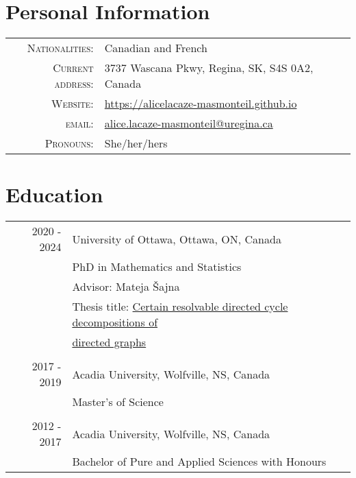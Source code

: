 \documentclass[letter,12pt]{article} %
\begin{document}


\par{\bigskip\par} %

\section{Personal Information}
\vspace{3mm}

\begin{tabular}{rl}
\textsc{Nationalities:} & Canadian and French  \\
\textsc{Current address:} & 3737 Wascana Pkwy, Regina, SK, S4S 0A2, Canada \\
\textsc{Website:} & \url{https://alicelacaze-masmonteil.github.io} \\
\textsc{email:} & \href{mailto:alice.lacaze-masmonteil@uregina.ca}{alice.lacaze-masmonteil@uregina.ca}\\
\textsc{Pronouns:}& She/her/hers\\
\end{tabular}

 
\section{Education}
\vspace{3mm}
\begin{tabular}{r | l}
 2020 - 2024 & University of Ottawa, Ottawa, ON, Canada \\
& PhD in Mathematics and Statistics \\
&Advisor: {Mateja \v{S}ajna} \\
&Thesis title: \href{https://ruor.uottawa.ca/items/10b8a59f-b558-439d-accd-93aca8d61529}{Certain resolvable directed cycle decompositions of}\\
& \hspace{2.17cm} \href{https://ruor.uottawa.ca/items/10b8a59f-b558-439d-accd-93aca8d61529}{directed graphs}\\ 
\multicolumn{1}{c}{} &\multicolumn{1}{c}{} \\
2017 - 2019 & Acadia University, Wolfville, NS, Canada   \\
& Master's of Science \\
\multicolumn{1}{c}{} &\multicolumn{1}{c}{} \\
2012 - 2017 & Acadia University, Wolfville, NS, Canada  \\
& Bachelor of Pure and Applied Sciences with Honours  \\
\end{tabular}
\end{document}
